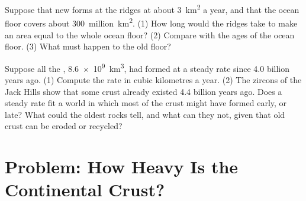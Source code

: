 \begin{exercise}[$\star\star\star$]\label{exo:g12:continental-crust:14}
Suppose that new  forms at the ridges at about \qty{3}{km^2} a
year, and that the ocean floor covers about \num{300}~million~\unit{km^2}. (1)
How long would the ridges take to make an area equal to the whole ocean
floor? (2) Compare with the ages of the ocean floor. (3) What must happen to
the old floor?
\end{exercise}

\begin{exercise}[$\star\star\star$]\label{exo:g12:continental-crust:15}
Suppose all the , \qty{8.6e9}{km^3}, had formed at a steady
rate since 4.0 billion years ago. (1) Compute the rate in cubic kilometres a
year. (2) The zircons of the Jack Hills show that some crust already existed
4.4 billion years ago. Does a steady rate fit a world in which most of the
crust might have formed early, or late? What could the oldest rocks tell, and
what can they not, given that old crust can be eroded or recycled?
\end{exercise}

\section{Problem: How Heavy Is the Continental Crust?}

